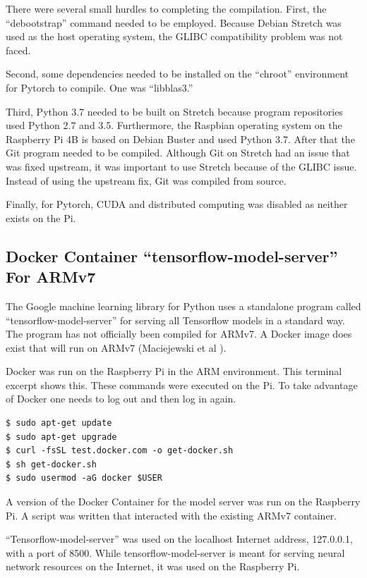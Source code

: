There were several small hurdles to completing the compilation. First, the ``debootstrap'' command needed to be employed. Because Debian Stretch was used as the host operating system, the GLIBC compatibility problem was not faced. 

Second, some dependencies needed to be installed on the ``chroot'' environment for Pytorch to compile. One was ``libblas3.''

Third, Python 3.7 needed to be built on Stretch because program repositories used Python 2.7 and 3.5. Furthermore, the Raspbian operating system on the Raspberry Pi 4B is based on Debian Buster and used Python 3.7. After that the Git program needed to be compiled. Although Git on Stretch had an issue that was fixed upstream, it was important to use Stretch because of the GLIBC issue. Instead of using the upstream fix, Git was compiled from source. 

Finally, for Pytorch, CUDA and distributed computing was disabled as neither exists on the Pi.

\subsection{Docker Container ``tensorflow-model-server'' For ARMv7}
The Google machine learning library for Python uses a standalone program called ``tensorflow-model-server'' for serving all Tensorflow models in a standard way. The program has not officially been compiled for ARMv7. A Docker image does exist that will run on ARMv7 (Maciejewski et al \cite{2020Maciejewski}).

Docker was run on the Raspberry Pi in the ARM environment. This terminal excerpt shows this. These commands were executed on the Pi. To take advantage of Docker one needs to log out and then log in again.

\begin{verbatim}
$ sudo apt-get update
$ sudo apt-get upgrade
$ curl -fsSL test.docker.com -o get-docker.sh 
$ sh get-docker.sh
$ sudo usermod -aG docker $USER
\end{verbatim}



A version of the Docker Container for the model server was run on the Raspberry Pi. A script was written that interacted with the existing ARMv7 container. %

``Tensorflow-model-server'' was used on the localhost Internet address, 127.0.0.1, with a port of 8500. While tensorflow-model-server is meant for serving neural network resources on the Internet, it was used on the Raspberry Pi.

